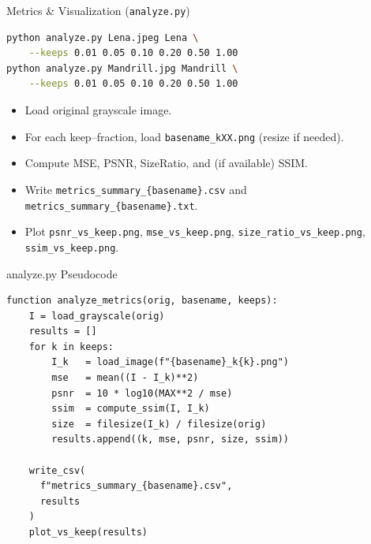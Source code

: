 \documentclass[12pt]{beamer}
\begin{document}
\begin{frame}[fragile]{Metrics \& Visualization (\texttt{analyze.py})}
\begin{lstlisting}[language=bash,breaklines=true]
python analyze.py Lena.jpeg Lena \
    --keeps 0.01 0.05 0.10 0.20 0.50 1.00
python analyze.py Mandrill.jpg Mandrill \
    --keeps 0.01 0.05 0.10 0.20 0.50 1.00
\end{lstlisting}

\begin{itemize}
  \item Load original grayscale image.
  \item For each keep–fraction, load \texttt{basename\_kXX.png} (resize if needed).
  \item Compute MSE, PSNR, SizeRatio, and (if available) SSIM.
  \item Write \texttt{metrics\_summary\_{\{basename\}}.csv} and \texttt{metrics\_summary\_{\{basename\}}.txt}.
  \item Plot \texttt{psnr\_vs\_keep.png}, \texttt{mse\_vs\_keep.png}, \texttt{size\_ratio\_vs\_keep.png}, \texttt{ssim\_vs\_keep.png}.
\end{itemize}
\end{frame}

\begin{frame}[fragile]{analyze.py Pseudocode}
\scriptsize
\begin{verbatim}
function analyze_metrics(orig, basename, keeps):
    I = load_grayscale(orig)
    results = []
    for k in keeps:
        I_k   = load_image(f"{basename}_k{k}.png")
        mse   = mean((I - I_k)**2)
        psnr  = 10 * log10(MAX**2 / mse)
        ssim  = compute_ssim(I, I_k)
        size  = filesize(I_k) / filesize(orig)
        results.append((k, mse, psnr, size, ssim))

    write_csv(
      f"metrics_summary_{basename}.csv", 
      results
    )
    plot_vs_keep(results)
\end{verbatim}
\normalsize
\end{frame}
\end{document}
